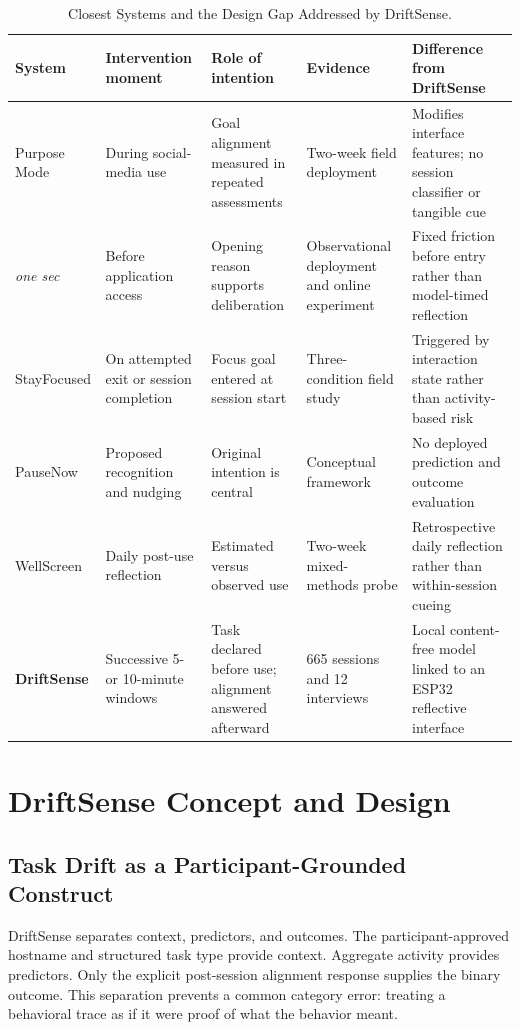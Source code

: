 \documentclass[12pt,a4paper]{article}
\newcommand{\citep}[1]{\parencite{#1}}
\begin{document}
\begin{table}[htbp]
\centering
\caption{Closest Systems and the Design Gap Addressed by DriftSense.}
\label{tab:related}
\small
\begin{tabularx}{\textwidth}{@{}p{2.7cm}YYYY@{}}
\toprule
System & Intervention moment & Role of intention & Evidence & Difference from DriftSense \\
\midrule
Purpose Mode \citep{lee2025purpose} & During social-media use & Goal alignment measured in repeated assessments & Two-week field deployment & Modifies interface features; no session classifier or tangible cue \\
\textit{one sec} \citep{gruning2023onesec} & Before application access & Opening reason supports deliberation & Observational deployment and online experiment & Fixed friction before entry rather than model-timed reflection \\
StayFocused \citep{li2024stayfocused} & On attempted exit or session completion & Focus goal entered at session start & Three-condition field study & Triggered by interaction state rather than activity-based risk \\
PauseNow \citep{zhao2024pausenow} & Proposed recognition and nudging & Original intention is central & Conceptual framework & No deployed prediction and outcome evaluation \\
WellScreen \citep{bhat2026wellscreen} & Daily post-use reflection & Estimated versus observed use & Two-week mixed-methods probe & Retrospective daily reflection rather than within-session cueing \\
\textbf{DriftSense} & Successive 5- or 10-minute windows & Task declared before use; alignment answered afterward & 665 sessions and 12 interviews & Local content-free model linked to an ESP32 reflective interface \\
\bottomrule
\end{tabularx}
\end{table}

\section{DriftSense Concept and Design}

\subsection{Task Drift as a Participant-Grounded Construct}

DriftSense separates context, predictors, and outcomes. The participant-approved hostname and structured task type provide context. Aggregate activity provides predictors. Only the explicit post-session alignment response supplies the binary outcome. This separation prevents a common category error: treating a behavioral trace as if it were proof of what the behavior meant.
\end{document}
